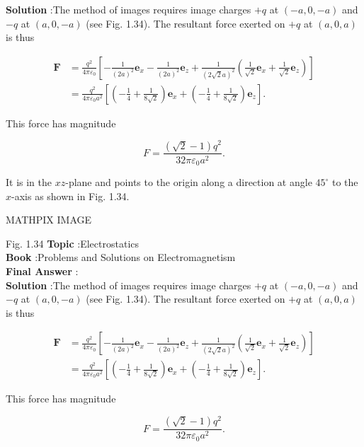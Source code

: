 \documentclass[10pt]{article}
\begin{document}
\textbf{Solution} :The method of images requires image charges $+q$ at $(-a, 0,-a)$ and $-q$ at $(a, 0,-a)$ (see Fig. 1.34). The resultant force exerted on $+q$ at $(a, 0, a)$ is thus

$$
\begin{aligned}
\mathbf{F} &=\frac{q^{2}}{4 \pi \varepsilon_{0}}\left[-\frac{1}{(2 a)^{2}} \mathbf{e}_{x}-\frac{1}{(2 a)^{2}} \mathbf{e}_{z}+\frac{1}{(2 \sqrt{2} a)^{2}}\left(\frac{1}{\sqrt{2}} \mathbf{e}_{x}+\frac{1}{\sqrt{2}} \mathbf{e}_{z}\right)\right] \\
&=\frac{q^{2}}{4 \pi \varepsilon_{0} a^{2}}\left[\left(-\frac{1}{4}+\frac{1}{8 \sqrt{2}}\right) \mathbf{e}_{x}+\left(-\frac{1}{4}+\frac{1}{8 \sqrt{2}}\right) \mathbf{e}_{z}\right] .
\end{aligned}
$$

This force has magnitude

$$
F=\frac{(\sqrt{2}-1) q^{2}}{32 \pi \varepsilon_{0} a^{2}} .
$$



It is in the $x z$-plane and points to the origin along a direction at angle $45^{\circ}$ to the $x$-axis as shown in Fig. 1.34.

MATHPIX IMAGE

Fig. 1.34
\textbf{Topic} :Electrostatics\\
\textbf{Book} :Problems and Solutions on Electromagnetism\\
\textbf{Final Answer} :\\


\textbf{Solution} :The method of images requires image charges $+q$ at $(-a, 0,-a)$ and $-q$ at $(a, 0,-a)$ (see Fig. 1.34). The resultant force exerted on $+q$ at $(a, 0, a)$ is thus

$$
\begin{aligned}
\mathbf{F} &=\frac{q^{2}}{4 \pi \varepsilon_{0}}\left[-\frac{1}{(2 a)^{2}} \mathbf{e}_{x}-\frac{1}{(2 a)^{2}} \mathbf{e}_{z}+\frac{1}{(2 \sqrt{2} a)^{2}}\left(\frac{1}{\sqrt{2}} \mathbf{e}_{x}+\frac{1}{\sqrt{2}} \mathbf{e}_{z}\right)\right] \\
&=\frac{q^{2}}{4 \pi \varepsilon_{0} a^{2}}\left[\left(-\frac{1}{4}+\frac{1}{8 \sqrt{2}}\right) \mathbf{e}_{x}+\left(-\frac{1}{4}+\frac{1}{8 \sqrt{2}}\right) \mathbf{e}_{z}\right] .
\end{aligned}
$$

This force has magnitude

$$
F=\frac{(\sqrt{2}-1) q^{2}}{32 \pi \varepsilon_{0} a^{2}} .
$$
\end{document}
